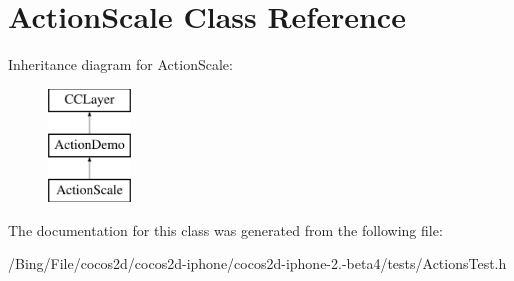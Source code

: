 \hypertarget{interface_action_scale}{\section{Action\-Scale Class Reference}
\label{interface_action_scale}
}
Inheritance diagram for Action\-Scale\-:\begin{figure}[H]
\begin{center}
\leavevmode
\includegraphics[height=3.000000cm]{interface_action_scale}
\end{center}
\end{figure}


The documentation for this class was generated from the following file\-:\begin{DoxyCompactItemize}
\item 
/\-Bing/\-File/cocos2d/cocos2d-\/iphone/cocos2d-\/iphone-\/2.-\/beta4/tests/Actions\-Test.\-h\end{DoxyCompactItemize}
